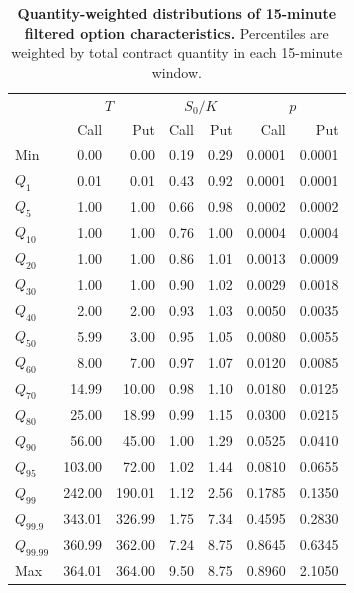 \begin{table}[htbp]
\centering
\begin{tabular}{lrrrrrr}
\hline
 & \multicolumn{2}{c}{$T$} & \multicolumn{2}{c}{$S_0/K$} & \multicolumn{2}{c}{$p$} \\
 & Call & Put & Call & Put & Call & Put \\
\hline
Min & 0.00 & 0.00 & 0.19 & 0.29 & 0.0001 & 0.0001 \\
$Q_1$ & 0.01 & 0.01 & 0.43 & 0.92 & 0.0001 & 0.0001 \\
$Q_5$ & 1.00 & 1.00 & 0.66 & 0.98 & 0.0002 & 0.0002 \\
$Q_{10}$ & 1.00 & 1.00 & 0.76 & 1.00 & 0.0004 & 0.0004 \\
$Q_{20}$ & 1.00 & 1.00 & 0.86 & 1.01 & 0.0013 & 0.0009 \\
$Q_{30}$ & 1.00 & 1.00 & 0.90 & 1.02 & 0.0029 & 0.0018 \\
$Q_{40}$ & 2.00 & 2.00 & 0.93 & 1.03 & 0.0050 & 0.0035 \\
$Q_{50}$ & 5.99 & 3.00 & 0.95 & 1.05 & 0.0080 & 0.0055 \\
$Q_{60}$ & 8.00 & 7.00 & 0.97 & 1.07 & 0.0120 & 0.0085 \\
$Q_{70}$ & 14.99 & 10.00 & 0.98 & 1.10 & 0.0180 & 0.0125 \\
$Q_{80}$ & 25.00 & 18.99 & 0.99 & 1.15 & 0.0300 & 0.0215 \\
$Q_{90}$ & 56.00 & 45.00 & 1.00 & 1.29 & 0.0525 & 0.0410 \\
$Q_{95}$ & 103.00 & 72.00 & 1.02 & 1.44 & 0.0810 & 0.0655 \\
$Q_{99}$ & 242.00 & 190.01 & 1.12 & 2.56 & 0.1785 & 0.1350 \\
$Q_{99.9}$ & 343.01 & 326.99 & 1.75 & 7.34 & 0.4595 & 0.2830 \\
$Q_{99.99}$ & 360.99 & 362.00 & 7.24 & 8.75 & 0.8645 & 0.6345 \\
Max & 364.01 & 364.00 & 9.50 & 8.75 & 0.8960 & 2.1050 \\
\hline
\end{tabular}
\caption{\textbf{Quantity-weighted distributions of 15-minute filtered option characteristics.} Percentiles are weighted by total contract quantity in each 15-minute window.}
\label{tab:filtered_weighted_option_characteristics}
\end{table}



